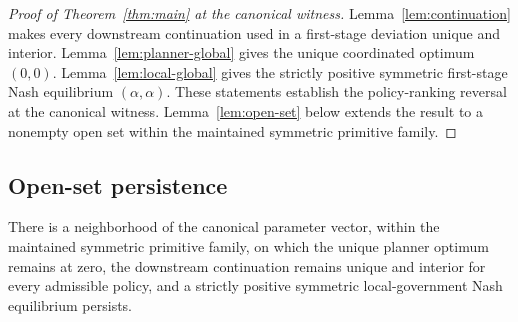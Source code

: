 \begin{proof}[Proof of Theorem~\ref{thm:main} at the canonical witness]
Lemma~\ref{lem:continuation} makes every downstream continuation used in a first-stage deviation unique and interior. Lemma~\ref{lem:planner-global} gives the unique coordinated optimum $(0,0)$. Lemma~\ref{lem:local-global} gives the strictly positive symmetric first-stage Nash equilibrium $(\alpha,\alpha)$. These statements establish the policy-ranking reversal at the canonical witness. Lemma~\ref{lem:open-set} below extends the result to a nonempty open set within the maintained symmetric primitive family.
\end{proof}

\subsection{Open-set persistence}

\begin{lemma}\label{lem:open-set}
There is a neighborhood of the canonical parameter vector, within the maintained symmetric primitive family, on which the unique planner optimum remains at zero, the downstream continuation remains unique and interior for every admissible policy, and a strictly positive symmetric local-government Nash equilibrium persists.
\end{lemma}

